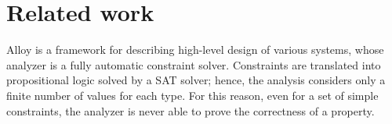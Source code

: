 \section{Related work}
\label{sec:related}
Alloy is a framework for describing high-level design of various systems, whose analyzer is a fully automatic constraint solver. Constraints are translated into propositional logic solved by a SAT solver; hence, the analysis considers only a finite number of values for each type. For this reason, even for a set of simple constraints, the analyzer is never able to prove the correctness of a property. 

